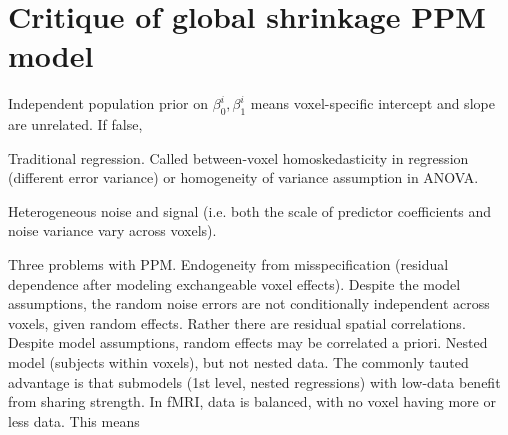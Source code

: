 \documentclass{article}
\begin{document}
\section{Critique of global shrinkage PPM model}

Independent population prior on $\beta_0^i,\beta_1^i$ means voxel-specific intercept and slope are unrelated. If false, 

Traditional regression. Called between-voxel homoskedasticity in regression (different error variance) or homogeneity of variance assumption in ANOVA.


Heterogeneous noise and signal (i.e. both the scale of predictor coefficients and noise variance vary across voxels).

Three problems with PPM. Endogeneity from misspecification (residual dependence after modeling exchangeable voxel effects). Despite the model assumptions, the random noise errors are not conditionally independent across voxels, given random effects. Rather there are residual spatial correlations. Despite model assumptions, random effects may be correlated a priori. Nested model (subjects within voxels), but not nested data. The commonly tauted advantage is that submodels (1st level, nested regressions) with low-data benefit from sharing strength. In fMRI, data is balanced, with no voxel having more or less data. This means 
\end{document}
